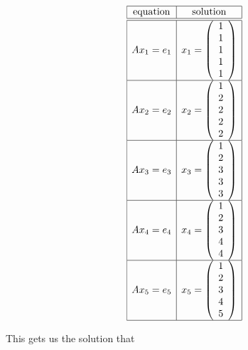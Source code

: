 \documentclass{article}
\begin{document}
\begin{enumerate}[a.]
\[
\begin{array}{|c|c|}
\hline
\hbox{equation}&\hbox{solution}\\
\hline
\hline
Ax_1 = e_1
&x_1 = \left(\begin{array}{c}
1\\
1\\
1\\
1\\
1\\
\end{array}\right)
\\
\hline
Ax_2 = e_2
&
x_2 = \left(\begin{array}{c}
1\\
2\\
2\\
2\\
2\\
\end{array}\right)
\\
\hline
Ax_3 = e_3
&
x_3 = \left(\begin{array}{c}
1\\
2\\
3\\
3\\
3\\
\end{array}\right)
\\
\hline
Ax_4 = e_4
&
x_4 = \left(\begin{array}{c}
1\\
2\\
3\\
4\\
4\\
\end{array}\right)
\\
\hline
Ax_5 = e_5
&
x_5 = \left(\begin{array}{c}
1\\
2\\
3\\
4\\
5\\
\end{array}\right)
\\
\hline
\end{array}
\]

This gets us the solution that


\end{enumerate}
\end{document}
